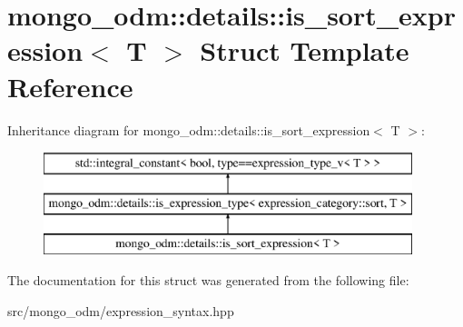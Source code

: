 \hypertarget{structmongo__odm_1_1details_1_1is__sort__expression}{}\section{mongo\+\_\+odm\+:\+:details\+:\+:is\+\_\+sort\+\_\+expression$<$ T $>$ Struct Template Reference}
\label{structmongo__odm_1_1details_1_1is__sort__expression}
Inheritance diagram for mongo\+\_\+odm\+:\+:details\+:\+:is\+\_\+sort\+\_\+expression$<$ T $>$\+:\begin{figure}[H]
\begin{center}
\leavevmode
\includegraphics[height=3.000000cm]{structmongo__odm_1_1details_1_1is__sort__expression}
\end{center}
\end{figure}


The documentation for this struct was generated from the following file\+:\begin{DoxyCompactItemize}
\item 
src/mongo\+\_\+odm/expression\+\_\+syntax.\+hpp\end{DoxyCompactItemize}
